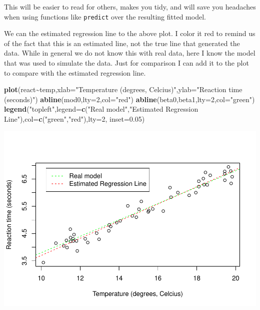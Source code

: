 \documentclass[
]{book}
\newenvironment{Shaded}{\begin{snugshade}}{\end{snugshade}}
\newcommand{\AttributeTok}[1]{\textcolor[rgb]{0.13,0.29,0.53}{#1}}
\newcommand{\DecValTok}[1]{\textcolor[rgb]{0.00,0.00,0.81}{#1}}
\newcommand{\FloatTok}[1]{\textcolor[rgb]{0.00,0.00,0.81}{#1}}
\newcommand{\FunctionTok}[1]{\textcolor[rgb]{0.13,0.29,0.53}{\textbf{#1}}}
\newcommand{\NormalTok}[1]{#1}
\newcommand{\SpecialCharTok}[1]{\textcolor[rgb]{0.81,0.36,0.00}{\textbf{#1}}}
\newcommand{\StringTok}[1]{\textcolor[rgb]{0.31,0.60,0.02}{#1}}
\begin{document}
This will be easier to read for others, makes you tidy, and will save you headaches when using functions like \texttt{predict} over the resulting fitted model.

We can the estimated regression line to the above plot. I color it red to remind us of the fact that this is an estimated line, not the true line that generated the data. While in general we do not know this with real data, here I know the model that was used to simulate the data. Just for comparison I can add it to the plot to compare with the estimated regression line.

\begin{Shaded}
\begin{Highlighting}[]
\FunctionTok{plot}\NormalTok{(react}\SpecialCharTok{\textasciitilde{}}\NormalTok{temp,}\AttributeTok{xlab=}\StringTok{"Temperature (degrees, Celcius)"}\NormalTok{,}\AttributeTok{ylab=}\StringTok{"Reaction time (seconds)"}\NormalTok{)}
\FunctionTok{abline}\NormalTok{(mod0,}\AttributeTok{lty=}\DecValTok{2}\NormalTok{,}\AttributeTok{col=}\StringTok{"red"}\NormalTok{)}
\FunctionTok{abline}\NormalTok{(beta0,beta1,}\AttributeTok{lty=}\DecValTok{2}\NormalTok{,}\AttributeTok{col=}\StringTok{"green"}\NormalTok{)}
\FunctionTok{legend}\NormalTok{(}\StringTok{"topleft"}\NormalTok{,}\AttributeTok{legend=}\FunctionTok{c}\NormalTok{(}\StringTok{"Real model"}\NormalTok{,}\StringTok{"Estimated Regression Line"}\NormalTok{),}\AttributeTok{col=}\FunctionTok{c}\NormalTok{(}\StringTok{"green"}\NormalTok{,}\StringTok{"red"}\NormalTok{),}\AttributeTok{lty=}\DecValTok{2}\NormalTok{, }\AttributeTok{inset=}\FloatTok{0.05}\NormalTok{)}
\end{Highlighting}
\end{Shaded}

\includegraphics{ECOMODbook_files/figure-latex/reg9-1.pdf}
\end{document}
